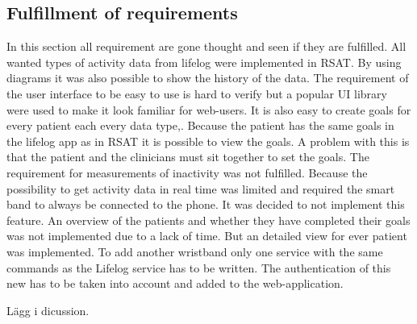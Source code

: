 \documentclass{cslthse-msc}
\begin{document}
\subsection{Fulfillment of requirements}

In this section all requirement are gone thought and seen if they are fulfilled. All wanted types of activity data from lifelog were implemented in RSAT. By using diagrams it was also possible to show the history of the data. The requirement of the user interface to be easy to use is hard to verify but a popular UI library were used to make it look familiar for web-users. It is also easy to create goals for every patient each every data type,. Because the patient has the same goals in the lifelog app as in RSAT it is possible to view the goals. A problem with this is that the patient and the clinicians must sit together to set the goals. The requirement for measurements of inactivity was not fulfilled. Because the possibility to get activity data in real time was limited and required the smart band to always be connected to the phone. It was decided to not implement this feature.  An overview of the patients and whether they have completed their goals was not implemented due to a lack of time. But an detailed view for ever patient was implemented. To add another wristband only one service with the same commands as the Lifelog service has to be written. The authentication of this new has to be taken into account and added to the web-application. 






Lägg i dicussion. 


\end{document}
